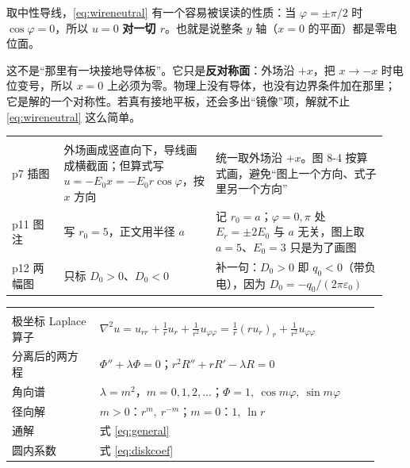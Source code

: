 
取中性导线，\eqref{eq:wireneutral} 有一个容易被误读的性质：当 $\varphi=\pm\pi/2$ 时 $\cos\varphi=0$，所以 $u=0$ \textbf{对一切 $r$}。也就是说整条 $y$ 轴（$x=0$ 的平面）都是零电位面。

这不是“那里有一块接地导体板”。它只是\textbf{反对称面}：外场沿 $+x$，把 $x\to-x$ 时电位变号，所以 $x=0$ 上必须为零。物理上没有导体，也没有边界条件加在那里；它是解的一个对称性。若真有接地平板，还会多出“镜像”项，解就不止 \eqref{eq:wireneutral} 这么简单。


\begin{center}
\tabtop
\begin{tabular}{@{}L{0.13\linewidth}L{0.38\linewidth}L{0.43\linewidth}@{}}
 &  &  \\
\tabmidrule
p7 插图 & 外场画成竖直向下，导线画成横截面；但算式写 $u=-E_0x=-E_0r\cos\varphi$，按 $x$ 方向 & 统一取外场沿 $+x$。图 8-4 按算式画，避免“图上一个方向、式子里另一个方向” \\
p11 图注 & 写 $r_0=5$，正文用半径 $a$ & 记 $r_0=a$；$\varphi=0,\pi$ 处 $E_r=\pm2E_0$ 与 $a$ 无关，图上取 $a=5$、$E_0=3$ 只是为了画图 \\
p12 两幅图 & 只标 $D_0>0$、$D_0<0$ & 补一句：$D_0>0$ 即 $q_0<0$（带负电），因为 $D_0=-q_0/(2\pi\varepsilon_0)$ \\
\end{tabular}
\tabbot
\end{center}


\label{sec:829}



\needspace{0.22\textheight}
\begin{center}
\tabtop
\begin{tabular}{@{}L{0.22\linewidth}L{0.70\linewidth}@{}}
 &  \\
\tabmidrule
极坐标 Laplace 算子 & $\nabla^2u=u_{rr}+\frac1ru_r+\frac1{r^2}u_{\varphi\varphi}=\frac1r(ru_r)_r+\frac1{r^2}u_{\varphi\varphi}$ \\
分离后的两方程 & $\Phi''+\lambda\Phi=0$；$r^2R''+rR'-\lambda R=0$ \\
角向谱 & $\lambda=m^2$，$m=0,1,2,\dots$；$\Phi=1,\ \cos m\varphi,\ \sin m\varphi$ \\
径向解 & $m>0$：$r^m,\ r^{-m}$；$m=0$：$1,\ \ln r$ \\
通解 & 式 \eqref{eq:general} \\
圆内系数 & 式 \eqref{eq:diskcoef} \\
\end{tabular}
\tabbot
\end{center}

